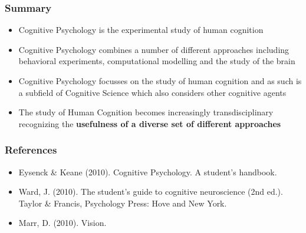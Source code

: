 \documentclass[]{beamer}
\begin{document}
\begin{frame}
 \frametitle{Summary}
\begin{itemize}
\setlength{\itemsep}{5pt}
 \item Cognitive Psychology is the experimental study of human cognition
 \item Cognitive Psychology combines a number of different approaches including behavioral experiments, computational modelling and the study of the brain
 \item Cognitive Psychology focusses on the study of human cognition and as such is a subfield of Cognitive Science which also considers other cognitive agents
 \item The study of Human Cognition becomes increasingly transdisciplinary recognizing the\textbf{ usefulness of a diverse set of different approaches}
\end{itemize}
\end{frame}


% 
% 
% 


\begin{frame}
 \frametitle{References}
\begin{small}
\begin{itemize}
 \item  Eysenck \& Keane (2010). Cognitive Psychology. A student's handbook. 
 \item Ward, J. (2010). The student's guide to cognitive neuroscience (2nd ed.). Taylor \& Francis, Psychology Press: Hove and New York.
 \item Marr, D. (2010). Vision.  
\end{itemize}
\end{small}
\end{frame}
\end{document}
